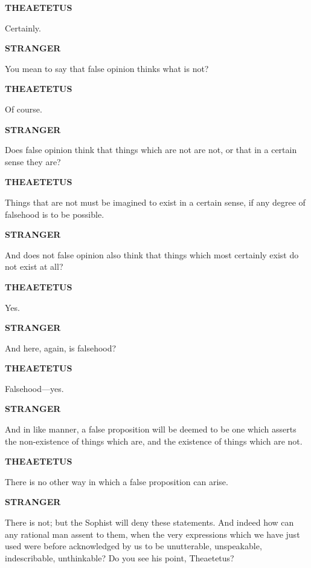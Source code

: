 \documentclass[11pt,letter]{article}
\begin{document}
\par \textbf{THEAETETUS}
\par   Certainly.

\par \textbf{STRANGER}
\par   You mean to say that false opinion thinks what is not?

\par \textbf{THEAETETUS}
\par   Of course.

\par \textbf{STRANGER}
\par   Does false opinion think that things which are not are not, or that in a certain sense they are?

\par \textbf{THEAETETUS}
\par   Things that are not must be imagined to exist in a certain sense, if any degree of falsehood is to be possible.

\par \textbf{STRANGER}
\par   And does not false opinion also think that things which most certainly exist do not exist at all?

\par \textbf{THEAETETUS}
\par   Yes.

\par \textbf{STRANGER}
\par   And here, again, is falsehood?

\par \textbf{THEAETETUS}
\par   Falsehood—yes.

\par \textbf{STRANGER}
\par   And in like manner, a false proposition will be deemed to be one which asserts the non-existence of things which are, and the existence of things which are not.

\par \textbf{THEAETETUS}
\par   There is no other way in which a false proposition can arise.

\par \textbf{STRANGER}
\par   There is not; but the Sophist will deny these statements. And indeed how can any rational man assent to them, when the very expressions which we have just used were before acknowledged by us to be unutterable, unspeakable, indescribable, unthinkable? Do you see his point, Theaetetus?
\end{document}
